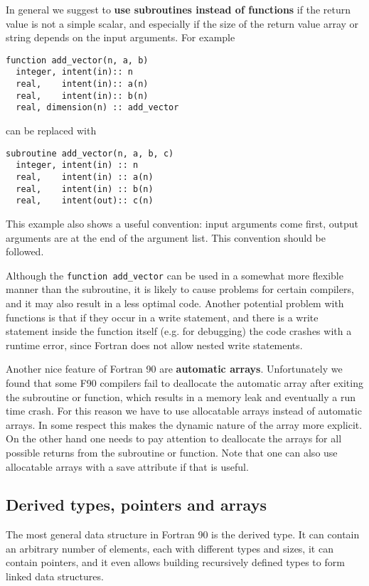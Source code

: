 \documentclass{article}
\begin{document}
In general we suggest to {\bf use subroutines instead of functions} if the
return value is not a simple scalar, and especially if the size of 
the return value array or string depends on the input arguments. 
For example
\begin{verbatim}
function add_vector(n, a, b)
  integer, intent(in):: n
  real,    intent(in):: a(n)
  real,    intent(in):: b(n)
  real, dimension(n) :: add_vector
\end{verbatim}
can be replaced with
\begin{verbatim}
subroutine add_vector(n, a, b, c)
  integer, intent(in) :: n
  real,    intent(in) :: a(n)
  real,    intent(in) :: b(n)
  real,    intent(out):: c(n)
\end{verbatim}
This example also shows a useful convention: input arguments come first,
output arguments are at the end of the argument list. This convention
should be followed.

Although the {\tt function add\_vector} can be used in a somewhat 
more flexible manner than the subroutine, 
it is likely to cause problems for certain 
compilers, and it may also result in a less optimal code. Another
potential problem with functions is that if they occur in a write
statement, and there is a write statement inside the function itself (e.g.
for debugging) the code crashes with a runtime error, since Fortran
does not allow nested write statements. 

Another nice feature of Fortran 90 are {\bf automatic arrays}. 
Unfortunately we found
that some F90 compilers fail to deallocate the automatic array after exiting 
the subroutine or function, which results in a memory leak and eventually
a run time crash. For this reason we have to use allocatable arrays instead
of automatic arrays. In some respect this makes the dynamic nature
of the array more explicit. On the other hand one needs to pay attention
to deallocate the arrays for all possible returns from the subroutine 
or function. Note that one can also use allocatable arrays with a save
attribute if that is useful.

\subsection{Derived types, pointers and arrays}

The most general data structure in Fortran 90 is the derived type.
It can contain an arbitrary number of elements, each with different
types and sizes, it can contain pointers, and it even allows building
recursively defined types to form linked data structures.
\end{document}
